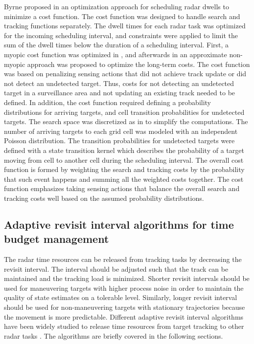 \documentclass[english, 12pt, a4paper, elec, utf8, a-1b, online]{aaltothesis}
\begin{document}
Byrne proposed in \cite{Byrne2015, Byrne2016} an optimization approach for scheduling radar dwells to minimize a cost function. 
The cost function was designed to handle search and tracking functions separately.
The dwell times for each radar task was optimized for the incoming scheduling interval, and constraints were applied to limit the sum of the dwell times below the duration of a scheduling interval.
First, a myopic cost function was optimized in \cite{Byrne2015}, and afterwards in \cite{Byrne2016} an approximate non-myopic approach was proposed to optimize the long-term costs.
The cost function was based on penalizing sensing actions that did not achieve track update or did not detect an undetected target.
Thus, costs for not detecting an undetected target in a surveillance area and not updating an existing track needed to be defined.
In addition, the cost function required defining a probability distributions for arriving targets, and cell transition probabilities for undetected targets.
The search space was discretized as in \cite{Kreucher2004} to simplify the computations.
The number of arriving targets to each grid cell was modeled with an independent Poisson distribution.
The transition probabilities for undetected targets were defined with a state transition kernel which describes the probability of a target moving from cell to another cell during the scheduling interval.
The overall cost function is formed by weighting the search and tracking costs by the probability that such event happens and summing all the weighted costs together.
The cost function emphasizes taking sensing actions that balance the overall search and tracking costs well based on the assumed probability distributions.

\subsection{Adaptive revisit interval algorithms for time budget management} \label{sec:tbm_ri}

The radar time resources can be released from tracking tasks by decreasing the revisit interval. 
The interval should be adjusted such that the track can be maintained and the tracking load is minimized.
Shorter revisit intervals should be used for maneuvering targets with higher process noise in order to maintain the quality of state estimates on a tolerable level. 
Similarly, longer revisit interval should be used for non-maneuvering targets with stationary trajectories because the movement is more predictable.
Different adaptive revisit interval algorithms have been widely studied to release time resources from target tracking to other radar tasks \cite{Cohen1986, Gardner1988, Munu1992, ChengTing2007, Baek2010, Watson1993, Charlish2015, Keuk1975, Shin1995, Benoudnine2006, Esfahani2012, Mofrad2017, Christiansen2018, Pilte2018}.
The algorithms are briefly covered in the following sections. 
\end{document}
